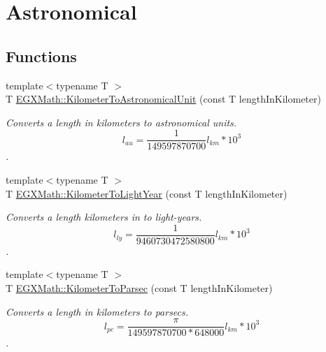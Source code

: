 \hypertarget{group___e_g_x_math-_conversions-_length_conversions-_s_i-_kilometer-_astronomical}{}\section{Astronomical}
\label{group___e_g_x_math-_conversions-_length_conversions-_s_i-_kilometer-_astronomical}
\subsection*{Functions}
\begin{DoxyCompactItemize}
\item 
{\footnotesize template$<$typename T $>$ }\\T \mbox{\hyperlink{group___e_g_x_math-_conversions-_length_conversions-_s_i-_kilometer-_astronomical_ga4c5c2b67611651c04072bfbb394a4ca7}{E\+G\+X\+Math\+::\+Kilometer\+To\+Astronomical\+Unit}} (const T length\+In\+Kilometer)
\begin{DoxyCompactList}\small\item\em Converts a length in kilometers to astronomical units. \[ l_{au}= \frac{1}{149597870700} l_{km} * 10^{3} \]. \end{DoxyCompactList}\item 
{\footnotesize template$<$typename T $>$ }\\T \mbox{\hyperlink{group___e_g_x_math-_conversions-_length_conversions-_s_i-_kilometer-_astronomical_ga265181afd822c061f51a157da711c0c5}{E\+G\+X\+Math\+::\+Kilometer\+To\+Light\+Year}} (const T length\+In\+Kilometer)
\begin{DoxyCompactList}\small\item\em Converts a length kilometers in to light-\/years. \[ l_{ly}= \frac{1}{9460730472580800} l_{km} * 10^{3} \]. \end{DoxyCompactList}\item 
{\footnotesize template$<$typename T $>$ }\\T \mbox{\hyperlink{group___e_g_x_math-_conversions-_length_conversions-_s_i-_kilometer-_astronomical_ga0d120dfc56490ce318348950abb25dd1}{E\+G\+X\+Math\+::\+Kilometer\+To\+Parsec}} (const T length\+In\+Kilometer)
\begin{DoxyCompactList}\small\item\em Converts a length in kilometers to parsecs. \[ l_{pc}=\frac{\pi}{149597870700 * 648000} l_{km} * 10^{3} \]. \end{DoxyCompactList}\end{DoxyCompactItemize}


